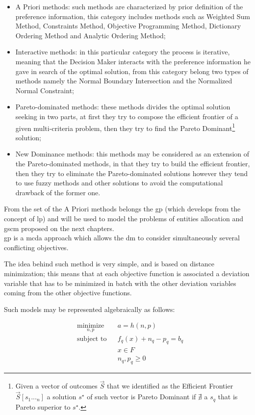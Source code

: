 \begin{doublespace}
\begin{itemize}
	\item A Priori methods: such methods are characterized by prior definition of the preference information, this category includes methods such as Weighted Sum Method, Constraints Method, Objective Programming Method, Dictionary Ordering Method and Analytic Ordering Method;   
	\item Interactive methods: in this particular category the process is iterative, meaning that the Decision Maker interacts with the preference information he gave in search of the optimal solution, from this category belong two types of methods namely the Normal Boundary Intersection and the Normalized Normal Constraint;
	\item Pareto-dominated methods: these methods divides the optimal solution seeking in two parts, at first they try to compose the efficient frontier of a given multi-criteria problem, then they try to find the Pareto Dominant\footnote{Given a vector of outcomes $\vec{S}$ that we identified as the Efficient Frontier $\vec{S}[s_1..._n]$ a solution $s^{\star}$ of such vector is Pareto Dominant if $\nexists$ a $s_q$ that is Pareto superior to $s^{\star}$.} solution;
	\item New Dominance methods: this methods may be considered as an extension of the Pareto-dominated methods, in that they try to build the efficient frontier, then they try to eliminate the Pareto-dominated solutions however they tend to use fuzzy methods and other solutions to avoid the computational drawback of the former one.  
\end{itemize}

From the set of the A Priori methods belongs the \gls{gp} (which develops from the concept of \gls{lp}) and will be used to model the problems of entities allocation and \gls{gscm} proposed on the next chapters.
\\
\gls{gp} is a \gls{mcda} approach which allows the \gls{dm} to consider simultaneously several conflicting objectives.

The idea behind such method is very simple, and is based on distance minimization; this means that at each objective function is associated a deviation variable that has to be minimized in batch with the other deviation variables coming from the other objective functions.

Such models may be represented algebraically as follows:

\begin{equation*}
\begin{aligned}
& \underset{n,p}{\text{minimize}}
& & a=h(n,p) \\
& \text{subject to}
& & f_q(x)+n_q-p_q=b_q \\
& & & x\in F \\
& & & n_q,p_q\geq 0 
\end{aligned}
\end{equation*}


\end{doublespace}
